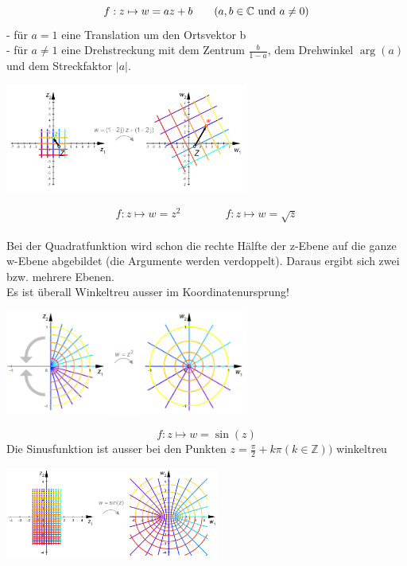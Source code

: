  	\begin{minipage}{9cm}
       $$ f : z \mapsto w = az + b \qquad (a, b \in \mathbb{C} \text{ und } a \neq0)\\$$
		- für $a = 1$ eine Translation um den Ortsvektor b \\
		- für $a \neq 1$ eine Drehstreckung mit dem Zentrum $\frac{b}{1-a}$, dem 
		Drehwinkel $\arg(a)$ und dem Streckfaktor $|a|$.  
    \end{minipage}
	\hspace{2cm}
	\begin{minipage}{8cm}
    	\includegraphics[width=8cm]{./bilder/LineareFunktion.png}
    \end{minipage}

	\begin{minipage}{9cm}
    	$$ f : z \mapsto w = z^2 \qquad \qquad f : z \mapsto w = \sqrt{z} $$\\
		Bei der Quadratfunktion wird schon die rechte Hälfte der z-Ebene auf die ganze
		w-Ebene abgebildet (die Argumente werden verdoppelt). Daraus ergibt sich
		zwei bzw. mehrere Ebenen.\\
		Es ist überall Winkeltreu ausser im Koordinatenursprung!
    \end{minipage}
	\hspace{2cm}
	\begin{minipage}{8cm}
    	\includegraphics[width=8cm]{./bilder/quadrat.png} 
    \end{minipage}
    
	 \begin{minipage}{10cm}
		$$ f : z \mapsto w = \sin(z) $$    
		Die Sinusfunktion ist ausser bei den Punkten $z = \frac{\pi}{2}+ k\pi (k \in
		\mathbb{Z}))$ winkeltreu
	\end{minipage}
	\hspace{2cm}
	\begin{minipage}{7cm}
		\includegraphics[width=7cm]{./bilder/sinus.png} 
	
	\end{minipage}

